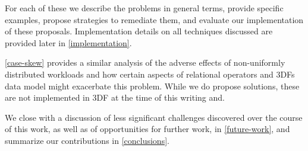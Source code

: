 \documentclass[../index.tex]{subfiles}
\begin{document}
For each of these we describe the problems in general terms, provide
specific examples, propose strategies to remediate them, and evaluate
our implementation of these proposals. Implementation details on all
techniques discussed are provided later in \autoref{implementation}.

\autoref{case-skew} provides a similar analysis of the adverse effects
of non-uniformly distributed workloads and how certain aspects of
relational operators and 3DFs data model might exacerbate this
problem. While we do propose solutions, these are not implemented in
3DF at the time of this writing and.

We close with a discussion of less significant challenges discovered
over the course of this work, as well as of opportunities for further
work, in \autoref{future-work}, and summarize our contributions in
\autoref{conclusions}.
\end{document}
